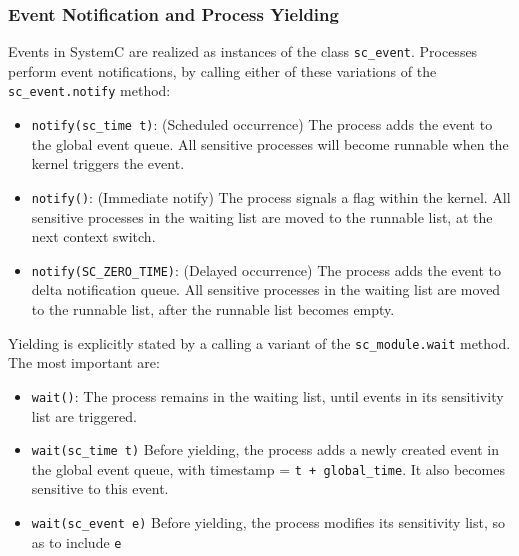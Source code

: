 \documentclass[11pt]{article}
\begin{document}
\subsubsection{Event Notification and Process Yielding}
\label{sec:org90edc8b}
Events in SystemC are realized as instances of the class \texttt{sc\_event}.
Processes perform event notifications, by calling either of these variations of the \texttt{sc\_event.notify} method:
\begin{itemize}
\item \texttt{notify(sc\_time t)}:     (Scheduled occurrence) The process adds the event to the global event queue. All sensitive processes will become runnable when the kernel triggers the event.
\item \texttt{notify()}:               (Immediate notify)    The process signals a flag within the kernel. All sensitive processes in the waiting list are moved to the runnable list, at the next context switch.
\item \texttt{notify(SC\_ZERO\_TIME)}: (Delayed occurrence)   The process adds the event to delta notification queue. All sensitive processes in the waiting list are moved to the runnable list, after the runnable list becomes empty.
\end{itemize}


Yielding is explicitly stated by a calling a variant of the \texttt{sc\_module.wait} method. The most important are:
\begin{itemize}
\item \texttt{wait()}:            The process remains in the waiting list, until events in its sensitivity list are triggered.
\item \texttt{wait(sc\_time t)}   Before yielding, the process adds a newly created event in the global event queue, with timestamp = \texttt{t + global\_time}. It also becomes sensitive to this event.
\item \texttt{wait(sc\_event e)}  Before yielding, the process modifies its sensitivity list, so as to include \texttt{e}
\end{itemize}
\end{document}
